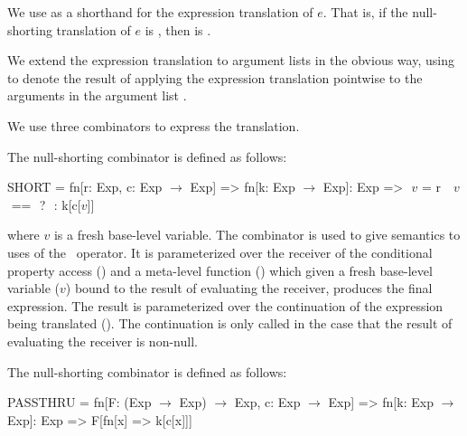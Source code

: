 \documentclass[makeidx]{article}
\begin{document}
{\LMHash{}%
We use
as a shorthand for
the expression translation of $e$.
That is, if the null-shorting translation of $e$ is ,
then  is .

\LMHash{}%
We extend the expression translation to argument lists in the obvious way,
using
to denote the result of applying the expression translation pointwise
to the arguments in the argument list .

\LMHash{}%
We use three combinators to express the translation.

\LMHash{}%
The null-shorting combinator
is defined as follows:

{%
\def\Base#1{\textcolor{normativeColor}{#1}}
\def\Meta#1{\textcolor{metaColor}{#1}}
\begin{metaLevelCode}
SHORT = fn[r: Exp, c: Exp $\rightarrow$ Exp] =>
          fn[k: Exp $\rightarrow$ Exp]: Exp =>
            \Base{\LET\,\,$v$\,\,=\,\,\Meta{r}\,\,\IN\,\,%
$v$\,\,==\,\,\NULL\,\,?\,\,\NULL\,\,:}\,\,k[c[\Base{$v$}]]
\end{metaLevelCode}
}

\noindent
where $v$ is a fresh base-level variable.
The  combinator is used
to give semantics to uses of the \ operator.
It is parameterized over the receiver of the conditional property access
()
and a meta-level function
()
which given a fresh base-level variable ($v$)
bound to the result of evaluating the receiver,
produces the final expression.
The result is parameterized over the continuation of
the expression being translated ().
The continuation is only called in the case that
the result of evaluating the receiver is non-null.

\LMHash{}%
The null-shorting combinator
is defined as follows:

\begin{metaLevelCode}
PASSTHRU = fn[F: (Exp $\rightarrow$ Exp) $\rightarrow$ Exp, %
c: Exp $\rightarrow$ Exp] =>
             fn[k: Exp $\rightarrow$ Exp]: Exp =>
               F[fn[x] => k[c[x]]]
\end{metaLevelCode}

}
\end{document}
